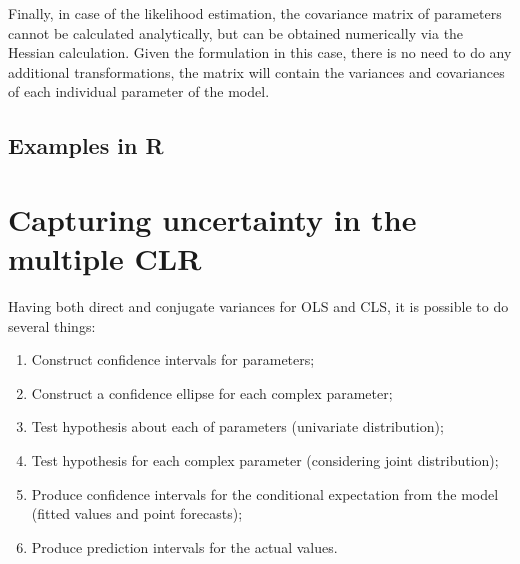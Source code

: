 \documentclass[
]{book}
\providecommand{\tightlist}{%
  \setlength{\itemsep}{0pt}\setlength{\parskip}{0pt}}
\begin{document}
Finally, in case of the likelihood estimation, the covariance matrix of parameters cannot be calculated analytically, but can be obtained numerically via the Hessian calculation. Given the formulation in this case, there is no need to do any additional transformations, the matrix will contain the variances and covariances of each individual parameter of the model.

\hypertarget{examples-in-r-1}{%
\subsection{Examples in R}\label{examples-in-r-1}}

\hypertarget{capturing-uncertainty-in-the-multiple-clr}{%
\section{Capturing uncertainty in the multiple CLR}\label{capturing-uncertainty-in-the-multiple-clr}}

Having both direct and conjugate variances for OLS and CLS, it is possible to do several things:

\begin{enumerate}
\def\labelenumi{\arabic{enumi}.}
\tightlist
\item
  Construct confidence intervals for parameters;
\item
  Construct a confidence ellipse for each complex parameter;
\item
  Test hypothesis about each of parameters (univariate distribution);
\item
  Test hypothesis for each complex parameter (considering joint distribution);
\item
  Produce confidence intervals for the conditional expectation from the model (fitted values and point forecasts);
\item
  Produce prediction intervals for the actual values.
\end{enumerate}
\end{document}
